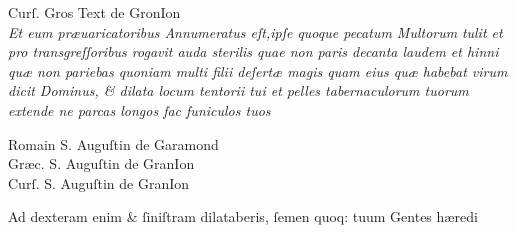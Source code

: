 \documentclass{article}
\newcommand{\threecolumntypefacenames}[3]{\begin{multicols}{3}
		\tiny
		\hfill \qquad \qquad \qquad \qquad #1\hspace*{\fill}\\
		\columnbreak
		\hfill #2\hspace*{\fill}\\
		\columnbreak
		\hfill #3\qquad \qquad \qquad \qquad \hspace*{\fill}
\end{multicols}}
\begin{document}
{\begin{multicols}{2}
	\columnbreak
	\tiny
	\centering
	Curſ. Gros Text de GronIon\\
	\vspace{0.5\baselineskip}
	\small
	\justifying
	\noindent
	\textit{Et eum pr\ae{}uaricatoribus Annumeratus eſt,ipſe quoque pecatum Multorum\linebreak}
	\textit{tulit et pro transgreſſoribus rogavit auda sterilis quae non paris decanta laudem et hinni qu\ae{} non pariebas quoniam multi filii deſert\ae{} magis quam eius qu\ae{} habebat virum dicit Dominus, \& dilata locum tentorii tui et pelles tabernaculorum tuorum extende ne parcas longos fac funiculos tuos\\}
\end{multicols}
\vspace{-2.2\baselineskip}
\threecolumntypefacenames{Romain S. Auguſtin de Garamond}{Gr\ae{}c. S. Auguſtin de GranIon}{Curſ. S. Auguſtin de GranIon}
\vspace{-2\baselineskip}
\begin{multicols}{2}
	\fontsize{8}{9}\selectfont
	\justifying
	\noindent \quad Ad dexteram enim \& ſiniſtram dilataberis, ſemen quoq: tuum Gentes h\ae{}redi\linebreak


\end{multicols}}
\end{document}
